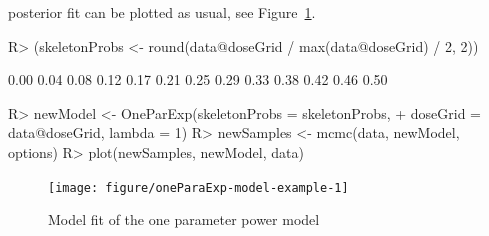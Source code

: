 \documentclass[article]{jss}\usepackage[]{graphicx}\usepackage[]{color}
\begin{document}
posterior fit can be plotted as usual, see Figure~\ref{fig:oneParaExp-model-example}.
\begin{Schunk}
\begin{Sinput}
R> (skeletonProbs <- round(data@doseGrid / max(data@doseGrid) / 2, 2))
\end{Sinput}
\begin{Soutput}
 [1] 0.00 0.04 0.08 0.12 0.17 0.21 0.25 0.29 0.33 0.38 0.42 0.46 0.50
\end{Soutput}
\begin{Sinput}
R> newModel <- OneParExp(skeletonProbs = skeletonProbs, 
+                        doseGrid = data@doseGrid, lambda = 1)
R> newSamples <- mcmc(data, newModel, options)
R> plot(newSamples, newModel, data)
\end{Sinput}
\begin{figure}

{\centering \texttt{[image: figure/oneParaExp-model-example-1]} 

}

\caption[Model fit of the one parameter power model]{Model fit of the one parameter power model}\label{fig:oneParaExp-model-example}
\end{figure}
\end{Schunk}
\end{document}

